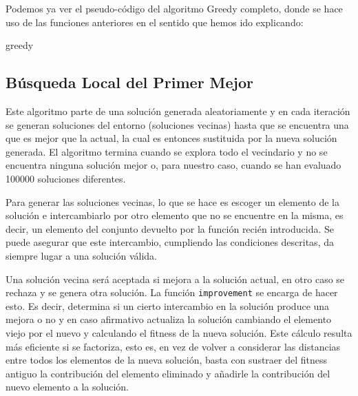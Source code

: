 \documentclass[11pt,a4paper]{article}
\begin{document}
	Podemos ya ver el pseudo-código del algoritmo Greedy completo, donde se hace uso de las funciones anteriores en el sentido que hemos ido explicando:
	

	\begin{algorithm}[H]
		\caption{\sc greedy}
	\end{algorithm}

\newpage
	\subsection{Búsqueda Local del Primer Mejor}
	
	Este algoritmo parte de una solución generada aleatoriamente y en cada iteración se generan soluciones del entorno (soluciones vecinas) hasta que se encuentra una que es mejor que la actual, la cual es entonces sustituida por la nueva solución generada. El algoritmo termina cuando se explora todo el vecindario y no se encuentra ninguna solución mejor o, para nuestro caso, cuando se han evaluado 100000 soluciones diferentes.
	

Para generar las soluciones vecinas, lo que se hace es escoger un elemento de la solución e intercambiarlo por otro elemento que no se encuentre en la misma, es decir, un elemento del conjunto devuelto por la función recién introducida. Se puede asegurar que este intercambio, cumpliendo las condiciones descritas, da siempre lugar a una solución válida. 

Una solución vecina será aceptada si mejora a la solución actual, en otro caso se rechaza y se genera otra solución. La función \lstinline|improvement| se encarga de hacer esto. Es decir, determina si un cierto intercambio en la solución produce una mejora o no y en caso afirmativo actualiza la solución cambiando el elemento viejo por el nuevo y calculando el fitness de la nueva solución. Este cálculo resulta más eficiente si se factoriza, esto es, en vez de volver a considerar las distancias entre todos los elementos de la nueva solución, basta con sustraer del fitness antiguo la contribución del elemento eliminado y añadirle la contribución del nuevo elemento a la solución. 
\end{document}

